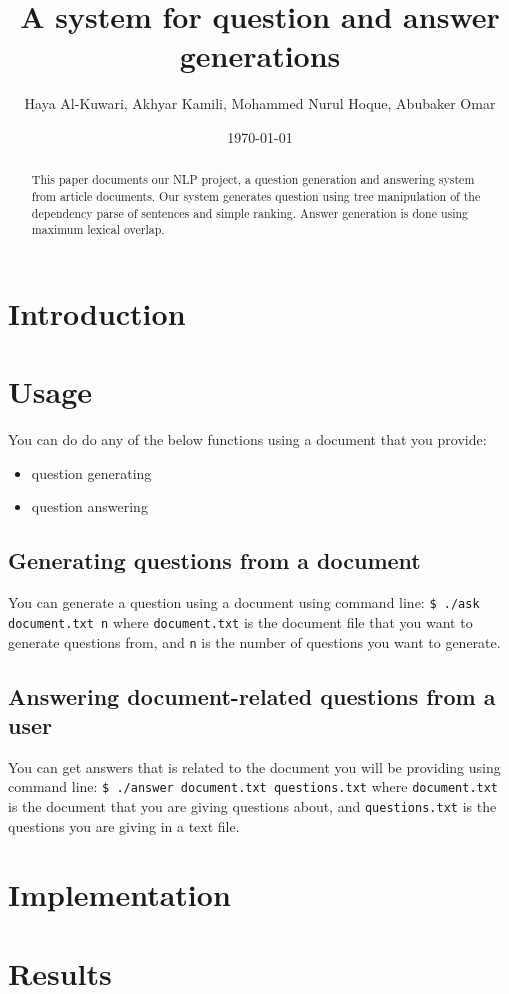 \documentclass{article}
\title{A system for question and answer generations}
\author{Haya Al-Kuwari, Akhyar Kamili, Mohammed Nurul Hoque, Abubaker Omar}
\date{\today}
\begin{document}
    \maketitle
    \begin{abstract}
        This paper documents our NLP project, a question generation and answering system from
        article documents. Our system generates question using tree manipulation of the dependency
        parse of sentences and simple ranking. Answer generation is done using maximum lexical
        overlap.
    \end{abstract}        
    \section{Introduction}
    \section{Usage}
    \noindent You can do do any of the below functions using a document that you provide: 
    \begin{itemize}
        \item question generating
        \item question answering
    \end{itemize}
        \subsection{Generating questions from a document}
        You can generate a question using a document using command line: \newline \newline
        \indent \indent \texttt{\$ ./ask document.txt n} \newline \newline
        \indent where \texttt{document.txt} is the document file that you want to generate questions from,
        and \texttt{n} is the 
        \indent number of questions you want to generate.
        \subsection{Answering document-related questions from a user}
        You can get answers that is related to the document you will be providing using command line: \newline \newline
        \indent \indent \texttt{\$ ./answer document.txt questions.txt} \newline \newline
        \indent where \texttt{document.txt} is the document that you are giving questions about, 
        and \texttt{questions.txt} is 
        \indent the questions you are giving in a text file. 
    \section{Implementation}
    \section{Results}
\end{document}
